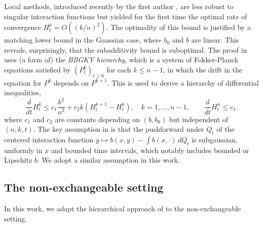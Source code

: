\documentclass[11pt,reqno]{amsart}
\numberwithin{equation}{section}
\theoremstyle{definition}
\begin{document}
Local methods, introduced recently by the first author  \cite{lacker2022hierarchies}, are less robust to singular interaction functions but yielded for the first time the optimal rate of convergence $H^k_t = O((k/n)^2)$. The optimality of this bound is justified by a matching lower bound in the Gaussian case, where $b_0$ and $b$ are linear. This reveals, surprisingly, that the subadditivity bound is suboptimal.
The proof in \cite{lacker2022hierarchies} uses (a form of) the \emph{BBGKY hierarchy}, which is a system of Fokker-Planck equations satisfied by $(P^k_t)_{t \ge 0}$ for each $k \le n-1$, in which the drift in the equation for $P^k$ depends on $P^{k+1}$. This is used to derive a hierarchy of differential inequalities,
\begin{equation}
\frac{d}{dt}H^k_t \le c_1 \frac{k^2}{n^2} + c_2 k (H^{k+1}_t - H^k_t), \quad k=1,\ldots,n-1, \qquad \frac{d}{dt}H^n_t \le c_1 . \label{intro:hierarchy-MF}
\end{equation}
where $c_1$ and $c_2$ are constants depending on $(b,b_0)$ but independent of $(n,k,t)$. 
The key assumption in \cite{lacker2022hierarchies} is that the pushforward under $Q_t$ of the centered interaction function $y \mapsto b(x,y) - \int b(x,\cdot)\,dQ_t$ is subgaussian, uniformly in $x$ and bounded time intervals, which notably includes bounded or Lipschitz $b$. We adopt a similar assumption in this work.



\subsection{The non-exchangeable setting} \label{se:intro-nonexchangeable}
In this work, we adapt the hierarchical approach of \cite{lacker2022hierarchies} to the non-exchangeable setting.
\end{document}
